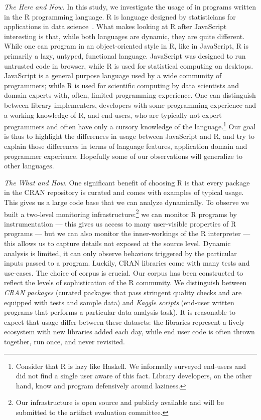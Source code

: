 \documentclass[review,screen,acmsmall,anonymous=true]{acmart}
\begin{document}
\vspace{2mm}\noindent\emph{The Here and Now.} In this study, we investigate the
usage of \eval in programs written in the R programming language. R is language
designed by statisticians for applications in data science~\cite{r,R96}. What
makes looking at R after JavaScript interesting is that, while both languages
are dynamic, they are quite different. While one can program in an
object-oriented style in R, like in JavaScript, R is primarily a lazy, untyped,
functional language. JavaScript was designed to run untrusted code in browser,
while R is used for statistical computing on desktops. JavaScript is a general
purpose language used by a wide community of programmers; while R is used for
scientific computing by data scientists and domain experts with, often, limited
programming experience. One can distinguish between library implementers,
developers with some programming experience and a working knowledge of R, and
end-users, who are typically not expert programmers and often have only a
cursory knowledge of the language.\footnote{Consider that R is lazy like
Haskell. We informally surveyed end-users and did not find a single user aware
of this fact. Library developers, on the other hand, know and program
defensively around laziness.} Our goal is thus to highlight the differences in
usage between JavaScript and R, and try to explain those differences in terms of
language features, application domain and programmer experience. Hopefully some
of our observations will generalize to other languages.

\vspace{2mm}\noindent\emph{The What and How.} One significant benefit of
choosing R is that every package in the CRAN repository is curated and comes
with examples of typical usage. This gives us a large code base that we can
analyze dynamically. To observe \eval we built a two-level monitoring
infrastructure:\footnote{Our infrastructure is open source and publicly
available and  will be submitted to the artifact evaluation committee. } we can
monitor R programs by instrumentation --- this gives us access to many
user-visible properties of R programs --- but we can also monitor the
inner-workings of the R interpreter --- this allows us to capture details not
exposed at the source level. Dynamic analysis is limited, it can only observe
behaviors triggered by the particular inputs passed to a program. Luckily, CRAN
libraries come with many tests and use-cases. The choice of corpus is crucial.
Our corpus has been constructed to reflect the levels of sophistication of the R
community. We distinguish between \emph{CRAN packages} (\CranPackages curated
packages that pass stringent quality checks and are equipped with tests and
sample data) and \emph{Kaggle scripts} (\KaggleUnique end-user written programs
that performs a particular data analysis task). It is reasonable to expect that
\eval usage differ between these datasets: the libraries represent a lively
ecosystem with new libraries added each day, while end user code is often thrown
together, run once, and never revisited.
\end{document}

